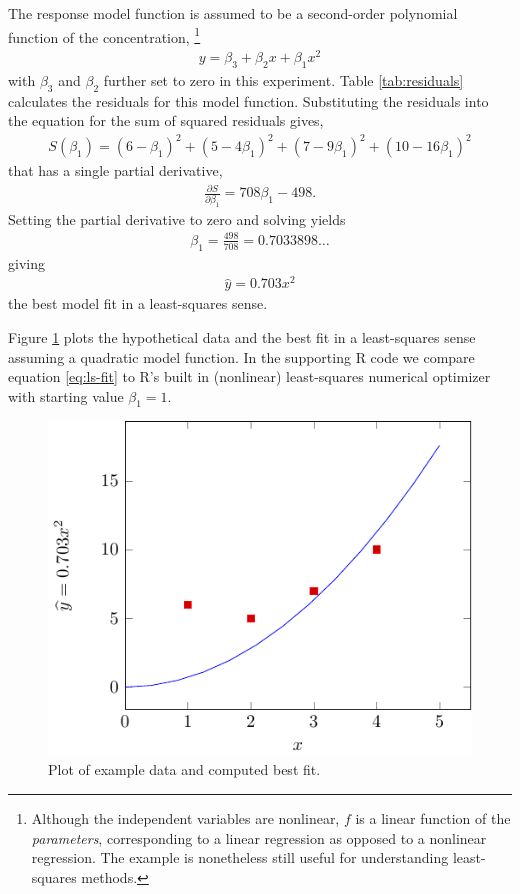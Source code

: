 The response model function is assumed to be a second-order polynomial
function of the concentration,%
\footnote{Although the independent variables are nonlinear, 
\(f\) is a linear function of the \emph{parameters}, 
corresponding to a linear regression as opposed to a nonlinear regression. 
The example is nonetheless still useful for understanding least-squares methods.}
\begin{align}
y = \beta_{3} + \beta_{2}x + \beta_{1}x^{2}
\end{align}
with \(\beta_{3}\) and \(\beta_{2}\) further set to zero in this
experiment. Table \ref{tab:residuals} calculates the residuals for this model function.
Substituting the residuals into the equation for the sum of squared
residuals gives,
\begin{align}
S\left( \beta_{1} \right) = \left( 6 - \beta_{1} \right)^{2} + \left( 5 - 4\beta_{1} \right)^{2} + \left( 7 - 9\beta_{1} \right)^{2} + \left( 10 - 16\beta_{1} \right)^{2}
\end{align}
that has a single partial derivative,
\begin{align}
\frac{\partial S}{\partial\beta_{1}} = 708\beta_{1} - 498.
\end{align}
Setting the partial derivative to zero and solving yields
\begin{align}
\beta_{1} = \frac{498}{708} = 0.7033898\ldots
\end{align}
giving
\begin{align}\label{eq:ls-fit}
\widehat{y} = 0.703x^{2}
\end{align}
the best model fit in a least-squares sense.

Figure \ref{fig:ls-fit} plots the hypothetical data and the best fit in a least-squares 
sense assuming a quadratic model function. 
In the supporting R code we compare equation \ref{eq:ls-fit} to R's built in (nonlinear) least-squares
numerical optimizer with starting value \(\beta_{1} = 1\).

\begin{figure}[h!]
\centering
\includegraphics[width=0.5\linewidth]{tikz/figure1.pdf}
\caption{%
Plot of example data and computed best fit.
}
\label{fig:ls-fit}
\end{figure}

